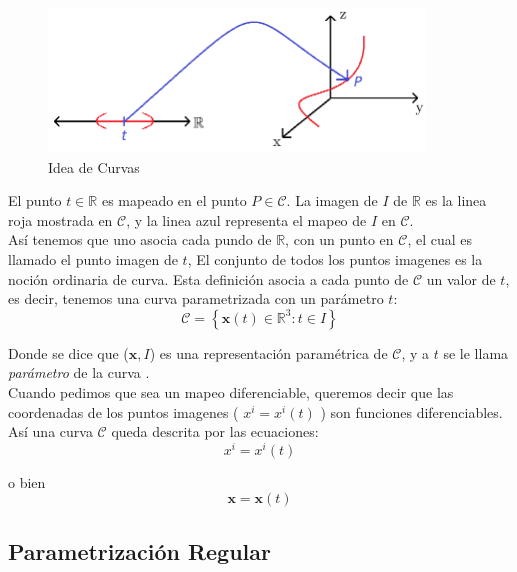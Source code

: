 \documentclass[letterpaper,11pt,twoside]{report}
\begin{document}
\begin{figure}[h!]
	\begin{center}
		\includegraphics[width=10cm]{idea_curva.png}
	\end{center}
	\label{figc1}
	\caption{Idea de Curvas}
\end{figure}

El punto $t \in \mathbb{R}$ es mapeado en el punto $P \in \mathcal{C}$. La imagen de $I$ de $\mathbb{R}$ es la linea roja mostrada en 
$\mathcal{C}$, y la linea azul representa el mapeo de $I$ en $\mathcal{C}$. \\

As\'i tenemos que uno asocia cada pundo de $\mathbb{R}$, con un punto en $\mathcal{C}$, el cual es llamado el punto imagen de 
$t$, El conjunto de todos los puntos imagenes es la noci\'on ordinaria de curva. Esta definici\'on asocia a cada punto de $\mathcal{C}$ 
un valor de $t$, es decir, tenemos una curva parametrizada con un par\'ametro $t$:
	\begin{equation*}
		\mathcal{C} = \left\{ \textbf{x}(t) \in \mathbb{R}^{3}: t \in I  \right\}
	\end{equation*}

Donde se dice que ($\textbf{x},I$) es una representaci\'on param\'etrica de $\mathcal{C}$, y a $t$ se le llama \textit{par\'ametro} de la 
curva . \\

Cuando pedimos que sea un mapeo diferenciable, queremos decir que las coordenadas de los puntos imagenes ( $ x^{i} = x^{i}(t)$ ) son 
funciones diferenciables. As\'i una curva $\mathcal{C}$ queda descrita por las ecuaciones:
	\begin{equation*}
		x^{i} = x^{i}(t)
	\end{equation*}
	
o bien
	\begin{equation*}
		\textbf{x} = \textbf{x}(t)
	\end{equation*}

\subsection{Parametrizaci\'on Regular}
\end{document}
